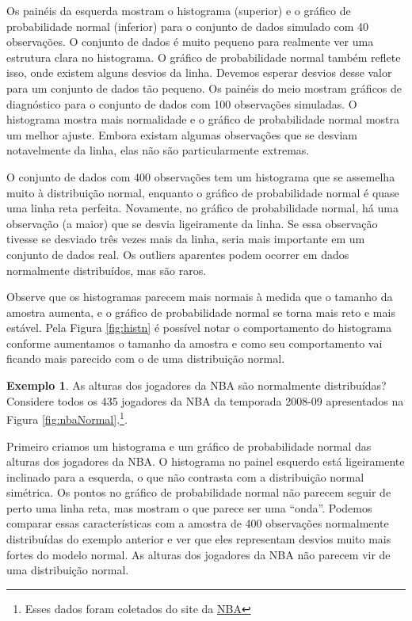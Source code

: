 \documentclass[
]{book}
\theoremstyle{definition}
\theoremstyle{definition}
\newtheorem{example}{Exemplo}[chapter]
\theoremstyle{definition}
\theoremstyle{definition}
\theoremstyle{remark}
\begin{document}
Os painéis da esquerda mostram o histograma (superior) e o gráfico de probabilidade normal (inferior) para o conjunto de dados simulado com 40 observações. O conjunto de dados é muito pequeno para realmente ver uma estrutura clara no histograma. O gráfico de probabilidade normal também reflete isso, onde existem alguns desvios da linha. Devemos esperar desvios desse valor para um conjunto de dados tão pequeno.
Os painéis do meio mostram gráficos de diagnóstico para o conjunto de dados com 100 observações simuladas. O histograma mostra mais normalidade e o gráfico de probabilidade normal mostra um melhor ajuste. Embora existam algumas observações que se desviam notavelmente da linha, elas não são particularmente extremas.

O conjunto de dados com 400 observações tem um histograma que se assemelha muito à distribuição normal, enquanto o gráfico de probabilidade normal é quase uma linha reta perfeita. Novamente, no gráfico de probabilidade normal, há uma observação (a maior) que se desvia ligeiramente da linha. Se essa observação tivesse se desviado três vezes mais da linha, seria mais importante em um conjunto de dados real. Os outliers aparentes podem ocorrer em dados normalmente distribuídos, mas são raros.

Observe que os histogramas parecem mais normais à medida que o tamanho da amostra aumenta, e o gráfico de probabilidade normal se torna mais reto e mais estável. Pela Figura \ref{fig:histn} é possível notar o comportamento do histograma conforme aumentamos o tamanho da amostra e como seu comportamento vai ficando mais parecido com o de uma distribuição normal.

\begin{example}
\protect\hypertarget{exm:unnamed-chunk-118}{}{\label{exm:unnamed-chunk-118} }As alturas dos jogadores da NBA são normalmente distribuídas? Considere todos os 435 jogadores da NBA da temporada 2008-09 apresentados na Figura \ref{fig:nbaNormal}.\footnote{Esses dados foram coletados do site da \href{www.nba.com}{NBA}}.
\end{example}

Primeiro criamos um histograma e um gráfico de probabilidade normal das alturas dos jogadores da NBA. O histograma no painel esquerdo está ligeiramente inclinado para a esquerda, o que não contrasta com a distribuição normal simétrica. Os pontos no gráfico de probabilidade normal não parecem seguir de perto uma linha reta, mas mostram o que parece ser uma ``onda''. Podemos comparar essas características com a amostra de 400 observações normalmente distribuídas do exemplo anterior e ver que eles representam desvios muito mais fortes do modelo normal. As alturas dos jogadores da NBA não parecem vir de uma distribuição normal.
\end{document}
